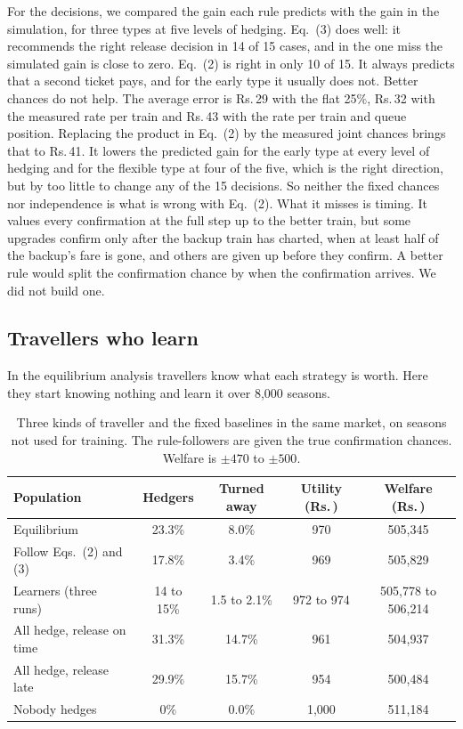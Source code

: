 \documentclass{article}
\newcommand{\rs}{Rs.\,}
\theoremstyle{definition}
\begin{document}
For the decisions, we compared the gain each rule predicts with the gain in the simulation,
for three types at five levels of hedging. Eq.~(3) does well: it recommends the right
release decision in 14 of 15 cases, and in the one miss the simulated gain is close to
zero. Eq.~(2) is right in only 10 of 15. It always predicts that a second ticket pays, and
for the early type it usually does not. Better chances do not help. The average error is
\rs29 with the flat 25\%, \rs32 with the measured rate per train and \rs43 with the rate
per train and queue position. Replacing the product in Eq.~(2) by the measured joint
chances brings that to \rs41. It lowers the predicted gain for the early type at every level of
hedging and for the flexible type at four of the five, which is the right direction, but
by too little to change any of the 15 decisions.
So neither the fixed chances nor independence is what is wrong with Eq.~(2). What it misses is timing. It values every confirmation at the
full step up to the better train, but some upgrades confirm only after the backup train
has charted, when at least half of the backup's fare is gone, and others are given up
before they confirm. A better rule would split the confirmation chance by when the
confirmation arrives. We did not build one.

\subsection{Travellers who learn}

In the equilibrium analysis travellers know what each strategy is worth. Here they start
knowing nothing and learn it over 8,000 seasons.

\begin{table}[ht]
\caption{Three kinds of traveller and the fixed baselines in the same market, on seasons
not used for training. The rule-followers are given the true confirmation chances. Welfare
is $\pm470$ to $\pm500$.}
\label{tab:learn}
\centering
\small
\begin{tabular}{lcccc}
\toprule
Population & Hedgers & Turned away & Utility (\rs) & Welfare (\rs) \\
\midrule
Equilibrium & 23.3\% & 8.0\% & 970 & 505,345 \\
Follow Eqs.~(2) and (3) & 17.8\% & 3.4\% & 969 & 505,829 \\
Learners (three runs) & 14 to 15\% & 1.5 to 2.1\% & 972 to 974 & 505,778 to 506,214 \\
\midrule
All hedge, release on time & 31.3\% & 14.7\% & 961 & 504,937 \\
All hedge, release late & 29.9\% & 15.7\% & 954 & 500,484 \\
Nobody hedges & 0\% & 0.0\% & 1,000 & 511,184 \\
\bottomrule
\end{tabular}
\end{table}
\end{document}
